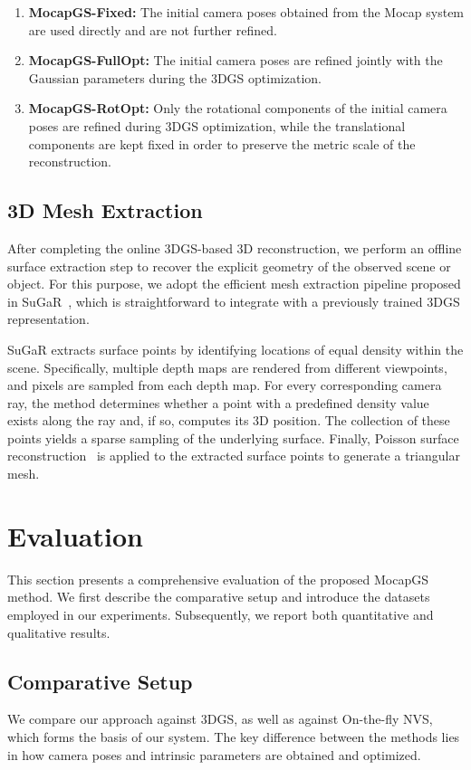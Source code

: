 \documentclass[a4paper,fleqn]{cas-dc}
\begin{document}
\begin{enumerate}
    \item \textbf{MocapGS-Fixed:} The initial camera poses obtained from the Mocap system are used directly and are not further refined.
    \item \textbf{MocapGS-FullOpt:} The initial camera poses are refined jointly with the Gaussian parameters during the 3DGS optimization.
    \item \textbf{MocapGS-RotOpt:} Only the rotational components of the initial camera poses are refined during 3DGS optimization, while the translational components are kept fixed in order to preserve the metric scale of the reconstruction.
\end{enumerate}

\subsection{3D Mesh Extraction}\label{ssec:methodology:mesh_extraction}
After completing the online 3DGS-based 3D reconstruction, we perform an offline surface extraction step to recover the explicit geometry of the observed scene or object. For this purpose, we adopt the efficient mesh extraction pipeline proposed in SuGaR~\cite{guedon_sugar_2024}, which is straightforward to integrate with a previously trained 3DGS representation.

SuGaR extracts surface points by identifying locations of equal density within the scene. Specifically, multiple depth maps are rendered from different viewpoints, and pixels are sampled from each depth map. For every corresponding camera ray, the method determines whether a point with a predefined density value exists along the ray and, if so, computes its 3D position. The collection of these points yields a sparse sampling of the underlying surface. Finally, Poisson surface reconstruction~\cite{kazhdan_poisson_2006} is applied to the extracted surface points to generate a triangular mesh.

\section{Evaluation}\label{sec:experiments}
This section presents a comprehensive evaluation of the proposed MocapGS method. We first describe the comparative setup and introduce the datasets employed in our experiments. Subsequently, we report both quantitative and qualitative results.

\subsection{Comparative Setup}
We compare our approach against 3DGS, as well as against On-the-fly NVS, which forms the basis of our system. The key difference between the methods lies in how camera poses and intrinsic parameters are obtained and optimized.
\end{document}
